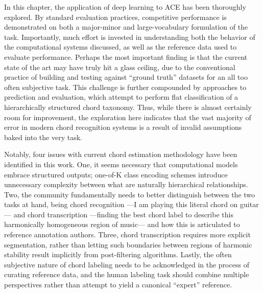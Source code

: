 In this chapter, the application of deep learning to ACE has been thoroughly explored.
By standard evaluation practices, competitive performance is demonstrated on both a major-minor and large-vocabulary formulation of the task.
Importantly, much effort is invested in understanding both the behavior of the computational systems discussed, as well as the reference data used to evaluate performance.
Perhaps the most important finding is that the current state of the art may have truly hit a glass ceiling, due to the conventional practice of building and testing against ``ground truth'' datasets for an all too often subjective task.
This challenge is further compounded by approaches to prediction and evaluation, which attempt to perform flat classification of a hierarchically structured chord taxonomy.
Thus, while there is almost certainly room for improvement, the exploration here indicates that the vast majority of error in modern chord recognition systems is a result of invalid assumptions baked into the very task.

Notably, four issues with current chord estimation methodology have been identified in this work.
One, it seems necessary that computational models embrace structured outputs; one-of-K class encoding schemes introduce unnecessary complexity between what are naturally hierarchical relationships.
Two, the community fundamentally needs to better distinguish between the two tasks at hand, being chord recognition ---I am playing this literal chord on guitar--- and chord transcription ---finding the best chord label to describe this harmonically homogeneous region of music--- and how this is articulated to reference annotation authors.
Three, chord transcription requires more explicit segmentation, rather than letting such boundaries between regions of harmonic stability result implicitly from post-filtering algorithms.
Lastly, the often subjective nature of chord labeling needs to be acknowledged in the process of curating reference data, and the human labeling task should combine multiple perspectives rather than attempt to yield a canonical ``expert'' reference.
